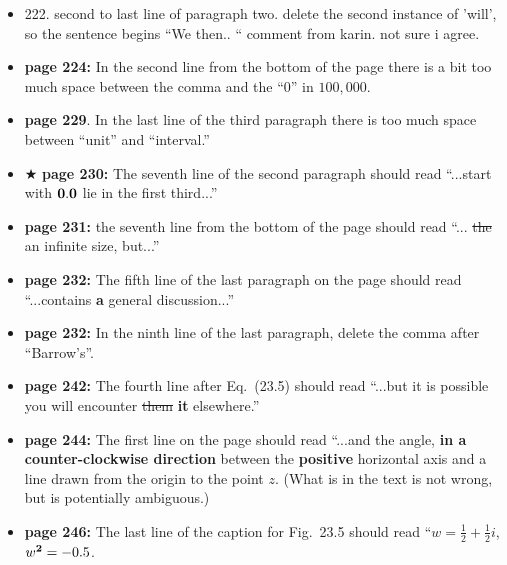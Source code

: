 \documentclass[12pt]{article}
\begin{document}
\begin{itemize}
  \item  222.  second to last line of paragraph two.  delete the second
  instance of 'will', so the sentence begins ``We then.. `` comment
  from karin.  not sure i agree. 

  \item {\bf page 224:}  In the second line from the bottom of the
    page there is a bit too much space between the comma and the ``0''
    in $100,000$. 

  \item {\bf page 229}.  In the last line of the third paragraph there
    is too much space between ``unit'' and ``interval.''  %

  \item $\bigstar$ {\bf page 230:}  The seventh line of the second
    paragraph should read ``...start with ${\bf 0.0}$ lie in the first
    third...'' 

  \item {\bf page 231:}  the seventh line from the bottom of the page
    should read ``... \sout{the} an infinite size, but...''%

  \item {\bf page 232:} The fifth line of the last paragraph on the
    page should read ``...contains {\bf a} general discussion...''

  \item {\bf page 232:}  In the ninth line of the last paragraph,
    delete the comma after ``Barrow's''. %

  \item {\bf page 242:}  The fourth line after Eq.~(23.5) should read
    ``...but it is possible you will encounter \sout{them} {\bf it}
    elsewhere.'' 

  \item {\bf page 244:}  The first line on the page should read
    ``...and the angle, {\bf in a counter-clockwise direction} between
    the {\bf positive} horizontal axis and a line drawn from the
    origin to the point $z$.  (What is in the text is not wrong, but
    is potentially ambiguous.)

  \item {\bf page 246:}  The last line of the caption for Fig.~23.5
    should read ``$w = \frac{1}{2} + \frac{1}{2}i$, $w^{\bf 2} =
    -0.5$. 


\end{itemize}
\end{document}
